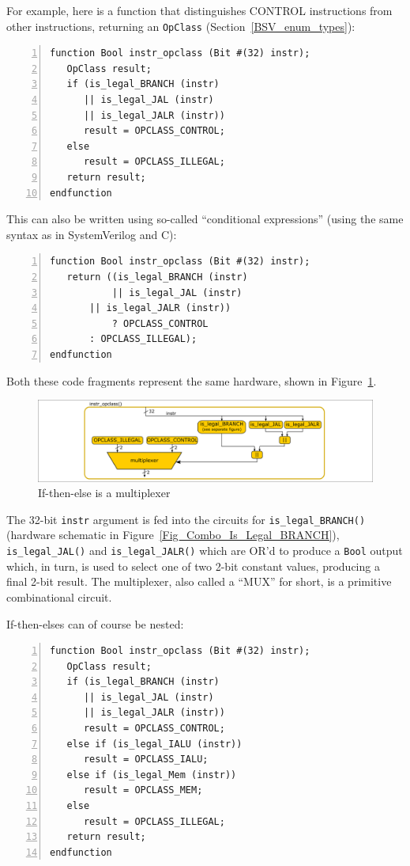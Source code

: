 For example, here is a function that distinguishes CONTROL
instructions from other instructions, returning an \verb|OpClass|
(Section~\ref{BSV_enum_types}):

\begin{Verbatim}[frame=single, numbers=left]
function Bool instr_opclass (Bit #(32) instr);
   OpClass result;
   if (is_legal_BRANCH (instr)
      || is_legal_JAL (instr)
      || is_legal_JALR (instr))
      result = OPCLASS_CONTROL;
   else
      result = OPCLASS_ILLEGAL;
   return result;
endfunction
\end{Verbatim}

This can also be written using so-called ``conditional expressions''
(using the same syntax as in SystemVerilog and C):

\begin{Verbatim}[frame=single, numbers=left]
function Bool instr_opclass (Bit #(32) instr);
   return ((is_legal_BRANCH (instr)
           || is_legal_JAL (instr)
	   || is_legal_JALR (instr))
           ? OPCLASS_CONTROL
	   : OPCLASS_ILLEGAL);
endfunction
\end{Verbatim}

Both these code fragments represent the same hardware, shown in
Figure~\ref{Fig_Combo_Multiplexer}.
\begin{figure}[htbp]
  \centerline{\includegraphics[width=6in,angle=0]{ch040_Combo_Circuits/Figures/Fig_Combo_Multiplexer}}
  \caption{\label{Fig_Combo_Multiplexer}If-then-else is a multiplexer}
\end{figure}
The 32-bit \verb|instr| argument is fed into the circuits for
\verb|is_legal_BRANCH()| (hardware schematic in
Figure~\ref{Fig_Combo_Is_Legal_BRANCH}), \verb|is_legal_JAL()| and
\verb|is_legal_JALR()| which are OR'd to produce a \verb|Bool| output
which, in turn, is used to select one of two 2-bit constant values,
producing a final 2-bit result.  The multiplexer, also called a
``MUX'' for short, is a primitive combinational circuit.

If-then-elses can of course be nested:


\begin{Verbatim}[frame=single, numbers=left]
function Bool instr_opclass (Bit #(32) instr);
   OpClass result;
   if (is_legal_BRANCH (instr)
      || is_legal_JAL (instr)
      || is_legal_JALR (instr))
      result = OPCLASS_CONTROL;
   else if (is_legal_IALU (instr))
      result = OPCLASS_IALU;
   else if (is_legal_Mem (instr))
      result = OPCLASS_MEM;
   else
      result = OPCLASS_ILLEGAL;
   return result;
endfunction
\end{Verbatim}

